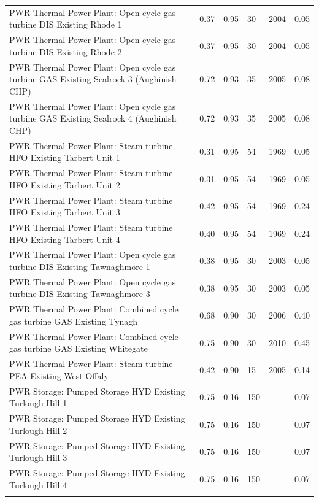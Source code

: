 \documentclass[journal abbreviation, manuscript]{copernicus}
\begin{document}
\begin{center}
\begin{longtable}{p{15em}lllll}
PWR Thermal Power Plant: Open cycle gas turbine DIS Existing Rhode 1 & 0.37 & 0.95 & 30 & 2004 & 0.05 \\
PWR Thermal Power Plant: Open cycle gas turbine DIS Existing Rhode 2 & 0.37 & 0.95 & 30 & 2004 & 0.05 \\
PWR Thermal Power Plant: Open cycle gas turbine GAS Existing Sealrock 3 (Aughinish CHP) & 0.72 & 0.93 & 35 & 2005 & 0.08 \\
PWR Thermal Power Plant: Open cycle gas turbine GAS Existing Sealrock 4 (Aughinish CHP) & 0.72 & 0.93 & 35 & 2005 & 0.08 \\
PWR Thermal Power Plant: Steam turbine HFO Existing Tarbert Unit 1 & 0.31 & 0.95 & 54 & 1969 & 0.05 \\
PWR Thermal Power Plant: Steam turbine HFO Existing Tarbert Unit 2 & 0.31 & 0.95 & 54 & 1969 & 0.05 \\
PWR Thermal Power Plant: Steam turbine HFO Existing Tarbert Unit 3 & 0.42 & 0.95 & 54 & 1969 & 0.24 \\
PWR Thermal Power Plant: Steam turbine HFO Existing Tarbert Unit 4 & 0.40 & 0.95 & 54 & 1969 & 0.24 \\
PWR Thermal Power Plant: Open cycle gas turbine DIS Existing Tawnaghmore 1 & 0.38 & 0.95 & 30 & 2003 & 0.05 \\
PWR Thermal Power Plant: Open cycle gas turbine DIS Existing Tawnaghmore 3 & 0.38 & 0.95 & 30 & 2003 & 0.05 \\
PWR Thermal Power Plant: Combined cycle gas turbine GAS Existing Tynagh & 0.68 & 0.90 & 30 & 2006 & 0.40 \\
PWR Thermal Power Plant: Combined cycle gas turbine GAS Existing Whitegate & 0.75 & 0.90 & 30 & 2010 & 0.45 \\
PWR Thermal Power Plant: Steam turbine PEA Existing West Offaly & 0.42 & 0.90 & 15 & 2005 & 0.14 \\
PWR Storage: Pumped Storage HYD Existing Turlough Hill 1 & 0.75 & 0.16 & 150 & & 0.07 \\
PWR Storage: Pumped Storage HYD Existing Turlough Hill 2 & 0.75 & 0.16 & 150 & & 0.07 \\
PWR Storage: Pumped Storage HYD Existing Turlough Hill 3 & 0.75 & 0.16 & 150 & & 0.07 \\
PWR Storage: Pumped Storage HYD Existing Turlough Hill 4 & 0.75 & 0.16 & 150 & & 0.07 \\ \hline

\label{base year generation units}
\end{longtable}
\end{center}
\end{document}
